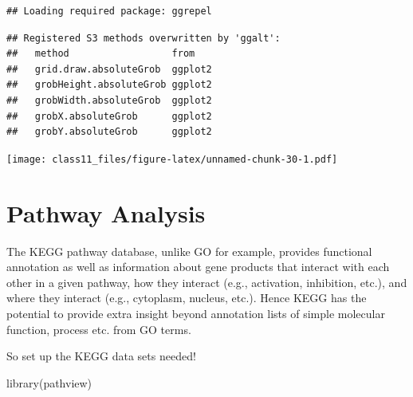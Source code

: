 \documentclass[
]{article}
\newenvironment{Shaded}{\begin{snugshade}}{\end{snugshade}}
\newcommand{\AttributeTok}[1]{\textcolor[rgb]{0.77,0.63,0.00}{#1}}
\newcommand{\FunctionTok}[1]{\textcolor[rgb]{0.00,0.00,0.00}{#1}}
\newcommand{\NormalTok}[1]{#1}
\newcommand{\OtherTok}[1]{\textcolor[rgb]{0.56,0.35,0.01}{#1}}
\newcommand{\SpecialCharTok}[1]{\textcolor[rgb]{0.00,0.00,0.00}{#1}}
\newcommand{\StringTok}[1]{\textcolor[rgb]{0.31,0.60,0.02}{#1}}
\begin{document}
\begin{verbatim}
## Loading required package: ggrepel
\end{verbatim}

\begin{verbatim}
## Registered S3 methods overwritten by 'ggalt':
##   method                  from   
##   grid.draw.absoluteGrob  ggplot2
##   grobHeight.absoluteGrob ggplot2
##   grobWidth.absoluteGrob  ggplot2
##   grobX.absoluteGrob      ggplot2
##   grobY.absoluteGrob      ggplot2
\end{verbatim}

\begin{Shaded}
\end{Shaded}

\texttt{[image: class11\_files/figure-latex/unnamed-chunk-30-1.pdf]}

\hypertarget{pathway-analysis}{%
\section{Pathway Analysis}\label{pathway-analysis}}

The KEGG pathway database, unlike GO for example, provides functional
annotation as well as information about gene products that interact with
each other in a given pathway, how they interact (e.g., activation,
inhibition, etc.), and where they interact (e.g., cytoplasm, nucleus,
etc.). Hence KEGG has the potential to provide extra insight beyond
annotation lists of simple molecular function, process etc. from GO
terms.

So set up the KEGG data sets needed!

\begin{Shaded}
\begin{Highlighting}[]
\FunctionTok{library}\NormalTok{(pathview)}
\end{Highlighting}
\end{Shaded}
\end{document}
